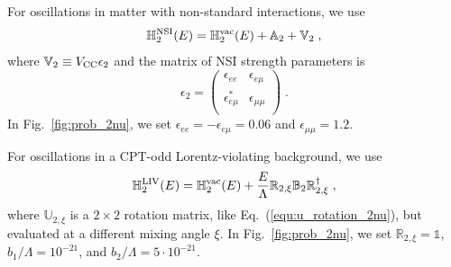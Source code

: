 \documentclass[final,5p,times,twocolumn]{elsarticle}
\newcommand{\eq}{Eq.}
\newcommand{\fig}{Fig.}
\newcommand{\equ}[1]{\eq~(\ref{equ:#1})}
\newcommand{\figu}[1]{\fig~\ref{fig:#1}}
\begin{document}
For oscillations in matter with non-standard interactions, we use\ \cite{GonzalezGarcia:2004wg, GonzalezGarcia:2005xw}
\begin{equation*}
 \label{equ:h2_nsi}
 \mathbb{H}_2^{\rm NSI}(E) 
 = 
 \mathbb{H}_2^{\rm vac}(E) + \mathbb{A}_2 + \mathbb{V}_2 \;,
\end{equation*}
where $\mathbb{V}_2 \equiv V_{\rm CC} \epsilon_2$ and the matrix of NSI strength parameters is
\begin{equation*}
 \epsilon_2
 =
 \left(
  \begin{array}{ccc}
   \epsilon_{ee}         & \epsilon_{e\mu}         \\
   \epsilon_{e\mu}^\ast  & \epsilon_{\mu\mu}       \\
  \end{array}
 \right) \;.
\end{equation*}
In \figu{prob_2nu}, we set $\epsilon_{ee} = -\epsilon_{e\mu} = 0.06$ and $\epsilon_{\mu\mu} = 1.2$.

For oscillations in a CPT-odd Lorentz-violating background, we use\ \cite{GonzalezGarcia:2004wg, GonzalezGarcia:2005xw} 
\begin{equation*}
 \label{equ:h2_liv}
 \mathbb{H}_2^{\rm LIV}(E) 
 = 
 \mathbb{H}_2^{\rm vac}(E) + \frac{E}{\Lambda} \mathbb{R}_{2,\xi} \mathbb{B}_2 \mathbb{R}_{2,\xi}^\dagger \;,
\end{equation*}
where $\mathbb{U}_{2,\xi}$ is a $2 \times 2$ rotation matrix, like \equ{u_rotation_2nu}, but evaluated at a different mixing angle $\xi$.  In \figu{prob_2nu}, we set $\mathbb{R}_{2,\xi} = \mathbb{1}$, $b_1/\Lambda = 10^{-21}$, and $b_2/\Lambda = 5 \cdot 10^{-21}$.

\newpage
\end{document}
